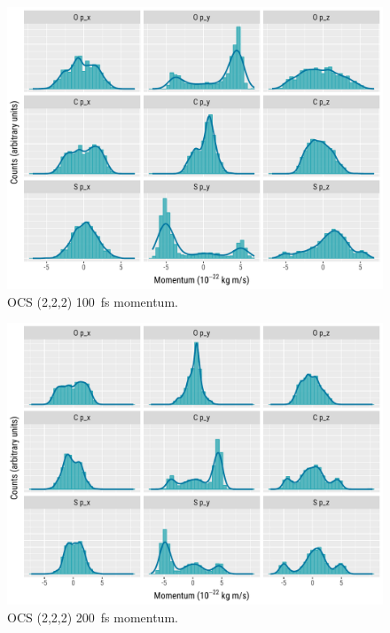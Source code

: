 \begin{figure}
  \centering
  \includegraphics[width=\textwidth]{Plots/OCS222100fsMomentum}
  \caption[OCS (2,2,2) \SI{100}{\fs} momentum.]
  {OCS (2,2,2) \SI{100}{\fs} momentum.}
  \label{fig:OCS222100fsMomentum}
\end{figure}

\begin{figure}
  \centering
  \includegraphics[width=\textwidth]{Plots/OCS222200fsMomentum}
  \caption[OCS (2,2,2) \SI{200}{\fs} momentum.]
  {OCS (2,2,2) \SI{200}{\fs} momentum.}
  \label{fig:OCS222200fsMomentum}
\end{figure}